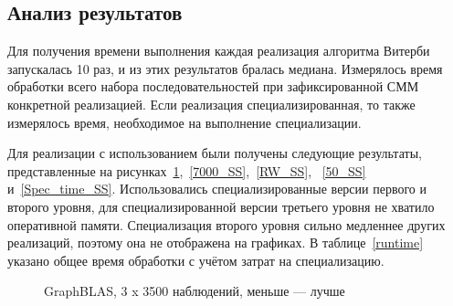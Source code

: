 \subsection{Анализ результатов}
Для получения времени выполнения каждая реализация алгоритма 
Витерби запускалась 10 раз, и из этих результатов бралась 
медиана.
Измерялось время обработки всего набора последовательностей при зафиксированной СММ конкретной реализацией.
Если реализация специализированная, то также измерялось время, необходимое на выполнение специализации.

Для реализации с использованием  были получены следующие результаты, представленные на рисунках~\ref{3500_SS},~\ref{7000_SS},~\ref{RW_SS},
~\ref{50_SS} и~\ref{Spec_time_SS}.
Использовались специализированные версии первого и второго уровня, для специализированной версии третьего уровня не хватило оперативной памяти.
Специализация второго уровня сильно медленнее других реализаций, поэтому она не отображена на графиках.
В таблице~\ref{runtime} указано общее время обработки с учётом затрат на специализацию.


\begin{figure}[!h]
\centering
    \caption{GraphBLAS, 3 x 3500 наблюдений, меньше --- лучше}
\label{3500_SS}
\end{figure}

